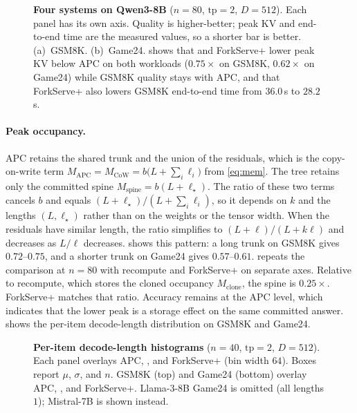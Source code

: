 \begin{figure}[t]
\centering
\resizebox{\columnwidth}{!}{}
\caption{\textbf{Four systems on Qwen3-8B} ($n{=}80$, $\mathrm{tp}{=}2$, $D{=}512$).
Each panel has its own axis. Quality is higher-better; peak KV and end-to-end time are the measured values, so a shorter bar is better.
(a)~GSM8K. (b)~Game24.
 shows that \sys and ForkServe+ lower peak KV below APC on both workloads ($0.75\times$ on GSM8K, $0.62\times$ on Game24) while GSM8K quality stays with APC, and that ForkServe+ also lowers GSM8K end-to-end time from $36.0$\,s to $28.2$\,s.}
\label{fig:eval-radar}
\end{figure}

\paragraph{Peak occupancy.}
APC retains the shared trunk and the union of the residuals, which is the copy-on-write term $M_{\mathrm{APC}}=M_{\mathrm{CoW}}=b\bigl(L+\sum_i\ell_i\bigr)$ from \eqref{eq:mem}. The tree retains only the committed spine $M_{\mathrm{spine}}=b(L+\ell_\star)$.
The ratio of these two terms cancels $b$ and equals $(L+\ell_\star)/(L+\sum_i\ell_i)$, so it depends on $k$ and the lengths $(L,\ell_\star)$ rather than on the weights or the tensor width.
When the residuals have similar length, the ratio simplifies to $(L+\ell)/(L+k\ell)$ and decreases as $L/\ell$ decreases.
 shows this pattern: a long trunk on GSM8K gives $0.72$--$0.75$, and a shorter trunk on Game24 gives $0.57$--$0.61$.
 repeats the comparison at $n{=}80$ with recompute and ForkServe+ on separate axes.
Relative to recompute, which stores the cloned occupancy $M_{\mathrm{clone}}$, the spine is $0.25\times$.
ForkServe+ matches that ratio.
Accuracy remains at the APC level, which indicates that the lower peak is a storage effect on the same committed answer.
 shows the per-item decode-length distribution on GSM8K and Game24.

\begin{figure}[t]
\centering
\resizebox{\textwidth}{!}{}
\caption{\textbf{Per-item decode-length histograms} ($n{=}40$, $\mathrm{tp}{=}2$, $D{=}512$).
Each panel overlays APC, \sys, and ForkServe+ (bin width $64$).
Boxes report $\mu$, $\sigma$, and $n$.
GSM8K (top) and Game24 (bottom) overlay APC, \sys, and ForkServe+.
Llama-3-8B Game24 is omitted (all lengths $1$); Mistral-7B is shown instead.}
\label{fig:eval-hist}
\end{figure}

